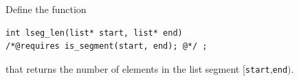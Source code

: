 \begin{flex}
\begin{exercise}
\label{ex:linked-list_length}
  Define the function
\begin{lstlisting}[language={[C0]C}]
int lseg_len(list* start, list* end)
/*@requires is_segment(start, end); @*/ ;
\end{lstlisting}
that returns the number of elements in the list segment
$[$\lstinline'start',\lstinline'end'$)$.
\end{exercise}

\begin{solution}
\label{ex:linked-list_length-solved}
\par\medskip\noindent\usebox{\lstbox}\par
\end{solution}
\end{flex}


